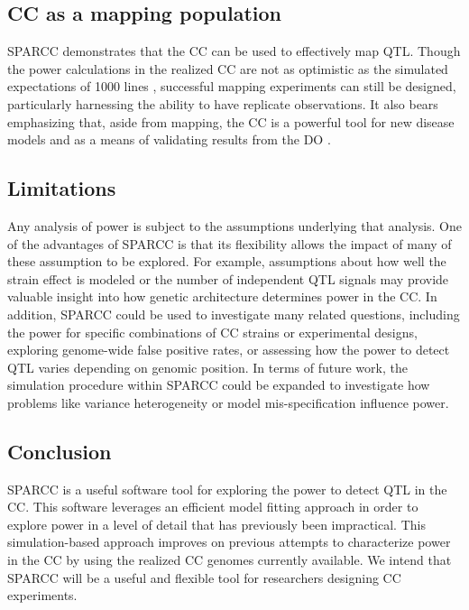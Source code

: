 \subsection{CC as a mapping population}

SPARCC demonstrates that the CC can be used to effectively map QTL. Though the power calculations in the realized CC are not as optimistic as the simulated expectations of 1000 lines \citep{Valdar2006c}, successful mapping experiments can still be designed, particularly harnessing the ability to have replicate observations. It also bears emphasizing that, aside from mapping, the CC is a powerful tool for new disease models \citep{Rogala2014,Gralinski2015} and as a means of validating results from the DO \citep{Chick2016}.

\subsection{Limitations}

Any analysis of power is subject to the assumptions underlying that analysis. One of the advantages of SPARCC is that its flexibility allows the impact of many of these assumption to be explored. For example, assumptions about how well the strain effect is modeled or the number of independent QTL signals may provide valuable insight into how genetic architecture determines power in the CC. In addition, SPARCC could be used to investigate many related questions, including the power for specific combinations of CC strains or experimental designs, exploring genome-wide false positive rates, or assessing how the power to detect QTL varies depending on genomic position. In terms of future work, the simulation procedure within SPARCC could be expanded to investigate how problems like variance heterogeneity or model mis-specification influence power.

\subsection{Conclusion}

SPARCC is a useful software tool for exploring the power to detect QTL in the CC. This software leverages an efficient model fitting approach in order to explore power in a level of detail that has previously been impractical. This simulation-based approach improves on previous attempts to characterize power in the CC by using the realized CC genomes currently available. We intend that SPARCC will be a useful and flexible tool for researchers designing CC experiments.

